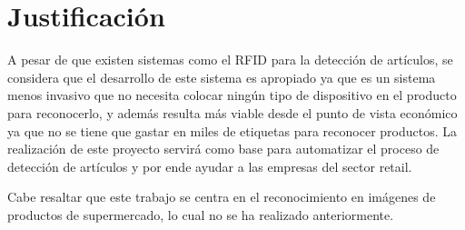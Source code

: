 \section{Justificaci\'on}

A pesar de que existen sistemas como el RFID para la detección de artículos, se considera que el desarrollo de este sistema es apropiado ya que es un sistema menos invasivo que no necesita colocar ningún tipo de dispositivo en el producto para reconocerlo, y además resulta más viable desde el punto de vista económico ya que no se tiene que gastar en miles de etiquetas para reconocer productos. La realización de este proyecto servirá como base para automatizar el proceso de detección de artículos y por ende ayudar a las empresas del sector retail.
 
Cabe resaltar que este trabajo se centra en el reconocimiento en imágenes de productos de supermercado, lo cual no se ha realizado anteriormente.
